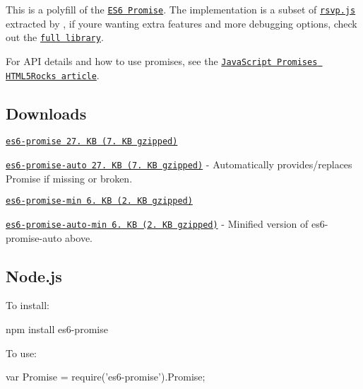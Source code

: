 This is a polyfill of the \href{http://people.mozilla.org/~jorendorff/es6-draft.html#sec-promise-constructor}{\tt E\+S6 Promise}. The implementation is a subset of \href{https://github.com/tildeio/rsvp.js}{\tt rsvp.\+js} extracted by , if you\textquotesingle{}re wanting extra features and more debugging options, check out the \href{https://github.com/tildeio/rsvp.js}{\tt full library}.

For A\+PI details and how to use promises, see the \href{http://www.html5rocks.com/en/tutorials/es6/promises/}{\tt Java\+Script Promises H\+T\+M\+L5\+Rocks article}.

\subsection*{Downloads}


\begin{DoxyItemize}
\item \href{https://raw.githubusercontent.com/stefanpenner/es6-promise/master/dist/es6-promise.js}{\tt es6-\/promise 27. KB (7. KB gzipped)}
\item \href{https://raw.githubusercontent.com/stefanpenner/es6-promise/master/dist/es6-promise.auto.js}{\tt es6-\/promise-\/auto 27. KB (7. KB gzipped)} -\/ Automatically provides/replaces {\ttfamily Promise} if missing or broken.
\item \href{https://raw.githubusercontent.com/stefanpenner/es6-promise/master/dist/es6-promise.min.js}{\tt es6-\/promise-\/min 6. KB (2. KB gzipped)}
\item \href{https://raw.githubusercontent.com/stefanpenner/es6-promise/master/dist/es6-promise.auto.min.js}{\tt es6-\/promise-\/auto-\/min 6. KB (2. KB gzipped)} -\/ Minified version of {\ttfamily es6-\/promise-\/auto} above.
\end{DoxyItemize}

\subsection*{Node.\+js}

To install\+:


\begin{DoxyCode}
npm install es6-promise
\end{DoxyCode}


To use\+:


\begin{DoxyCode}
var Promise = require('es6-promise').Promise;
\end{DoxyCode}


